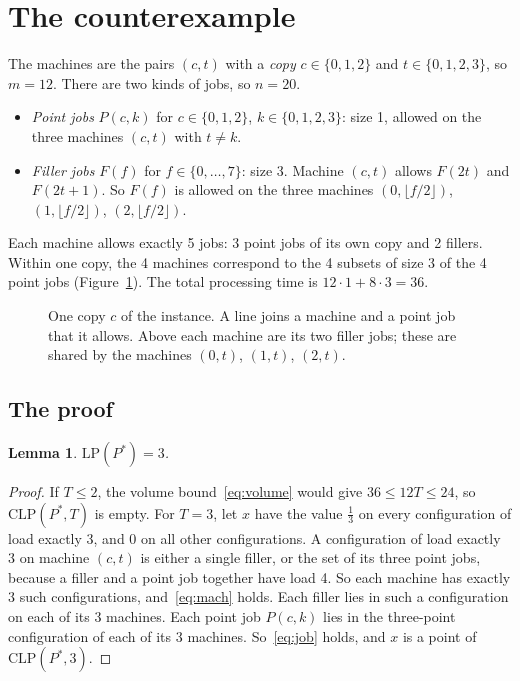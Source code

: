 \documentclass[11pt]{article}
\newtheorem{lemma}[theorem]{Lemma}
\theoremstyle{remark}
\newcommand{\CLP}{\mathrm{CLP}}
\newcommand{\LP}{\mathrm{LP}}
\begin{document}
\section{The counterexample}\label{sec:instance}
The machines are the pairs $(c,t)$ with a \emph{copy} $c\in\{0,1,2\}$
and $t\in\{0,1,2,3\}$, so $m=12$. There are two kinds of jobs, so $n=20$.
\begin{itemize}
\item \emph{Point jobs} $P(c,k)$ for $c\in\{0,1,2\}$, $k\in\{0,1,2,3\}$:
size 1, allowed on the three machines $(c,t)$ with $t\neq k$.
\item \emph{Filler jobs} $F(f)$ for $f\in\{0,\dots,7\}$: size 3. Machine
$(c,t)$ allows $F(2t)$ and $F(2t+1)$. So $F(f)$ is allowed on the three
machines $(0,\lfloor f/2\rfloor)$, $(1,\lfloor f/2\rfloor)$,
$(2,\lfloor f/2\rfloor)$.
\end{itemize}
Each machine allows exactly 5 jobs: 3 point jobs of its own copy and 2
fillers. Within one copy, the 4 machines correspond to the 4 subsets of
size 3 of the 4 point jobs (Figure~\ref{fig:copy}). The total
processing time is $12\cdot 1+8\cdot 3=36$.

\begin{figure}[ht]
\centering
{}
\caption{One copy $c$ of the instance. A line joins a machine and a
point job that it allows. Above each machine are its two filler jobs;
these are shared by the machines $(0,t)$, $(1,t)$, $(2,t)$.}
\label{fig:copy}
\end{figure}

\subsection{The proof}\label{sec:proof}

\begin{lemma}\label{lem:lp}
$\LP(P^\ast)=3$.
\end{lemma}
\begin{proof}
If $T\le 2$, the volume bound~\eqref{eq:volume} would give
$36\le 12T\le 24$, so $\CLP(P^\ast,T)$ is empty. For $T=3$, let $x$ have
the value $\frac13$ on every configuration of load exactly 3, and $0$
on all other configurations. A configuration of load exactly 3 on
machine $(c,t)$ is either a single filler, or the set of its three
point jobs, because a filler and a point job together have load 4. So
each machine has exactly 3 such configurations, and~\eqref{eq:mach}
holds. Each filler lies in such a configuration on each of its 3
machines. Each point job $P(c,k)$ lies in the three-point configuration
of each of its 3 machines. So~\eqref{eq:job} holds, and $x$ is a point
of $\CLP(P^\ast,3)$.
\end{proof}
\end{document}
